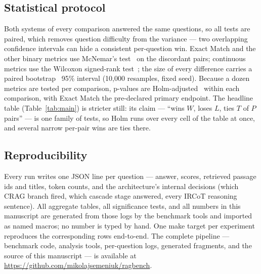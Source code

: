 \subsection{Statistical protocol}
\label{sec:setup-stats}

Both systems of every comparison answered the same questions, so all tests
are paired, which removes question difficulty from the variance ---
two overlapping confidence intervals can hide a consistent per-question
win. Exact Match and the other binary metrics use McNemar's
test~\citep{mcnemar1947} on the discordant pairs; continuous metrics use
the Wilcoxon signed-rank test~\citep{wilcoxon1945}; the size of every
difference carries a paired bootstrap~\citep{efron1979bootstrap} 95\%
interval (10{,}000 resamples, fixed seed). Because a dozen metrics are
tested per comparison, p-values are Holm-adjusted~\citep{holm1979} within
each comparison, with Exact Match the pre-declared primary endpoint. The
headline table (Table~\ref{tab:main}) is stricter still: its claim ---
``wins $W$, loses $L$, ties $T$ of $P$ pairs'' --- is one family of tests,
so Holm runs over every cell of the table at once, and several narrow
per-pair wins are ties there.

\subsection{Reproducibility}
\label{sec:setup-repro}

Every run writes one JSON line per question --- answer, scores, retrieved
passage ids and titles, token counts, and the architecture's internal
decisions (which CRAG branch fired, which cascade stage answered, every
IRCoT reasoning sentence). All aggregate tables, all significance tests,
and all numbers in this manuscript are generated from those logs by the
benchmark tools and imported as named macros; no number is typed by hand.
One make target per experiment reproduces the corresponding rows
end-to-end. The complete pipeline --- benchmark code, analysis tools,
per-question logs, generated fragments, and the source of this manuscript
--- is available at \url{https://github.com/mikolajsemeniuk/ragbench}.
